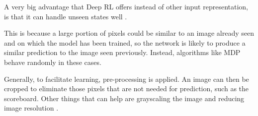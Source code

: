 A very big advantage that Deep RL offers instead of other input representation,
is that it can handle unseen states well \cite{mnih2013playing} \cite{karpathy2016deep}.

This is because a large portion of pixels could be similar to an image already seen and on which the model has been trained, so the network is likely to produce a similar prediction to the image seen previously. Instead, algorithms like MDP behave randomly in these cases.

Generally, to facilitate learning, pre-processing is applied.
An image can then be cropped to eliminate those pixels that are not needed for prediction, such as the scoreboard. Other things that can help are grayscaling the image and reducing image resolution \cite{mnih2013playing}.
